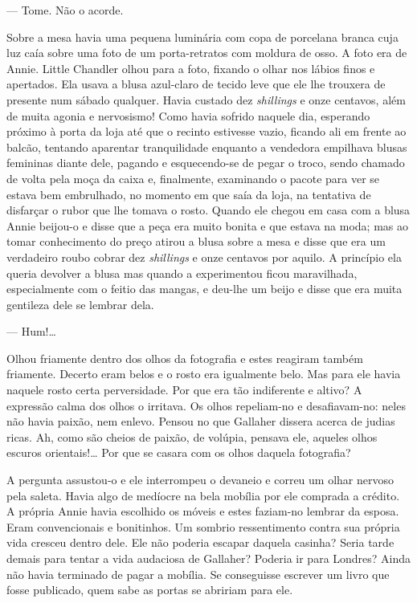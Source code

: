--- Tome.  Não o acorde.

Sobre a mesa havia uma pequena luminária com copa de porcelana branca cuja luz
caía sobre uma foto de um porta-retratos com moldura de osso.  A foto era de
Annie.  Little Chandler olhou para a foto, fixando o olhar nos lábios finos e
apertados.  Ela usava a blusa azul-claro de tecido leve que ele lhe trouxera de
presente num sábado qualquer.  Havia custado dez \textit{shillings} e onze
centavos, além de muita agonia e nervosismo! Como havia sofrido naquele dia,
esperando próximo à porta da loja até que o recinto estivesse vazio, ficando
ali em frente ao balcão, tentando aparentar tranquilidade enquanto a vendedora
empilhava blusas femininas diante dele, pagando e esquecendo-se de pegar o
troco, sendo chamado de volta pela moça da caixa e, finalmente, examinando o
pacote para ver se estava bem embrulhado, no momento em que saía da loja, na
tentativa de disfarçar o rubor que lhe tomava o rosto.  Quando ele chegou em
casa com a blusa Annie beijou-o e disse que a peça era muito bonita e que
estava na moda; mas ao tomar conhecimento do preço atirou a blusa sobre a mesa
e disse que era um verdadeiro roubo cobrar dez \textit{shillings} e onze
centavos por aquilo.  A princípio ela queria devolver a blusa mas quando a
experimentou ficou maravilhada, especialmente com o feitio das mangas, e
deu-lhe um beijo e disse que era muita gentileza dele se lembrar dela.

--- Hum!\ldots{}

Olhou friamente dentro dos olhos da fotografia e estes reagiram também
friamente.  Decerto eram belos e o rosto era igualmente belo.  Mas para ele
havia naquele rosto certa perversidade.  Por que era tão indiferente e altivo?
A expressão calma dos olhos o irritava.  Os olhos repeliam-no e desafiavam-no:
neles não havia paixão, nem enlevo.  Pensou no que Gallaher dissera acerca de
judias ricas.  Ah, como são cheios de paixão, de volúpia, pensava ele, aqueles
olhos escuros orientais!\ldots{} Por que se casara com os olhos daquela
fotografia?

A pergunta assustou-o e ele interrompeu o devaneio e correu um olhar nervoso
pela saleta.  Havia algo de medíocre na bela mobília por ele comprada a
crédito.  A própria Annie havia escolhido os móveis e estes faziam-no lembrar
da esposa.  Eram convencionais e bonitinhos.  Um sombrio ressentimento contra
sua própria vida cresceu dentro dele.  Ele não poderia escapar daquela casinha?
Seria tarde demais para tentar a vida audaciosa de Gallaher?  Poderia ir para
Londres?  Ainda não havia terminado de pagar a mobília.  Se conseguisse
escrever um livro que fosse publicado, quem sabe as portas se abririam para
ele.

